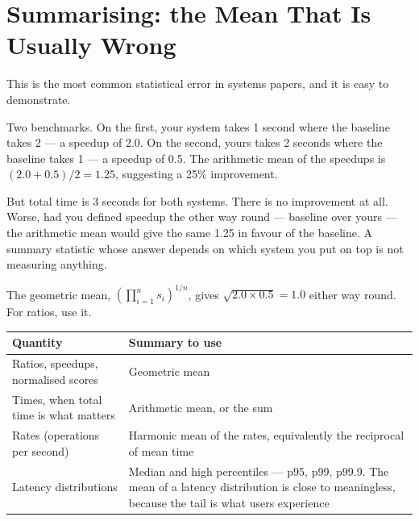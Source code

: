 \section{Summarising: the Mean That Is Usually Wrong}

\begin{alertbox}
This is the most common statistical error in systems papers, and it is easy to
demonstrate.

\medskip
Two benchmarks. On the first, your system takes 1 second where the baseline
takes 2 --- a speedup of 2.0. On the second, yours takes 2 seconds where the
baseline takes 1 --- a speedup of 0.5. The arithmetic mean of the speedups is
$(2.0 + 0.5)/2 = 1.25$, suggesting a 25\% improvement.

\medskip
But total time is 3 seconds for both systems. There is no improvement at all.
Worse, had you defined speedup the other way round --- baseline over yours ---
the arithmetic mean would give the same 1.25 in favour of the baseline. A
summary statistic whose answer depends on which system you put on top is not
measuring anything.

\medskip
The geometric mean, $\left(\prod_{i=1}^{n} s_i\right)^{1/n}$, gives
$\sqrt{2.0 \times 0.5} = 1.0$ either way round. For ratios, use it.
\end{alertbox}

\begin{center}
\small
\begin{tabular}{@{}L{3.6cm}L{10.7cm}@{}}
\toprule
\textbf{Quantity} & \textbf{Summary to use} \\
\midrule
Ratios, speedups, normalised scores & Geometric mean \\
Times, when total time is what matters & Arithmetic mean, or the sum \\
Rates (operations per second)       & Harmonic mean of the rates, equivalently
                                      the reciprocal of mean time \\
Latency distributions               & Median and high percentiles --- p95, p99,
                                      p99.9. The mean of a latency distribution
                                      is close to meaningless, because the tail
                                      is what users experience \\
\bottomrule
\end{tabular}
\end{center}

